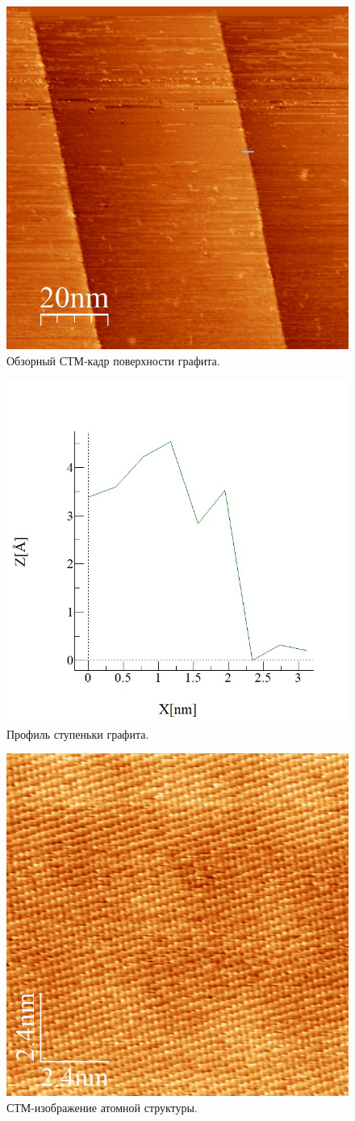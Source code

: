 \documentclass[a4paper, 12pt]{article}
\begin{document}
	\begin{figure}[H]
		\centering
		\includegraphics[width=0.6\linewidth]{2_step}
		\caption{Обзорный СТМ-кадр поверхности графита.}
		\label{fig:2_step}
	\end{figure}
	
	\begin{figure}[H]
		\centering
		\includegraphics[width=0.6\linewidth]{2_step_anal}
		\caption{Профиль ступеньки графита.}
		\label{fig:2_step_anal}
	\end{figure}
	
	\begin{figure}[H]
		\centering
		\includegraphics[width=0.6\linewidth]{2_small_atoms}
		\caption{СТМ-изображение атомной структуры.}
		\label{fig:2_small_atoms}
	\end{figure}
	
\end{document}
